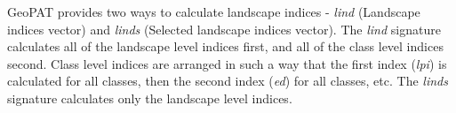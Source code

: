 GeoPAT provides two ways to calculate landscape indices - {\it lind} (Landscape indices vector) and {\it linds} (Selected landscape indices vector).
The {\it lind} signature calculates all of the landscape level indices first, and all of the class level indices second.
Class level indices are arranged in such a way that the first index ({\it lpi}) is calculated for all classes, then the second index ({\it ed}) for all classes, etc. 
The {\it linds} signature calculates only the landscape level indices. 

% 
% 
% 
% 
% 
